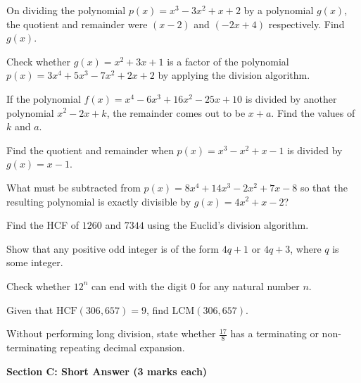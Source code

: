 \documentclass[12pt,a4paper]{exam}
\begin{document}
\begin{questions}
\question[2] On dividing the polynomial $p(x) = x^3 - 3x^2 + x + 2$ by a polynomial $g(x)$, the quotient and remainder were $(x - 2)$ and $(-2x + 4)$ respectively. Find $g(x)$.
\vspace{0.15cm}

\question[2] Check whether $g(x) = x^2 + 3x + 1$ is a factor of the polynomial $p(x) = 3x^4 + 5x^3 - 7x^2 + 2x + 2$ by applying the division algorithm.
\vspace{0.15cm}

\question[2] If the polynomial $f(x) = x^4 - 6x^3 + 16x^2 - 25x + 10$ is divided by another polynomial $x^2 - 2x + k$, the remainder comes out to be $x + a$. Find the values of $k$ and $a$.
\vspace{0.15cm}

\question[2] Find the quotient and remainder when $p(x) = x^3 - x^2 + x - 1$ is divided by $g(x) = x - 1$.
\vspace{0.15cm}

\question[2] What must be subtracted from $p(x) = 8x^4 + 14x^3 - 2x^2 + 7x - 8$ so that the resulting polynomial is exactly divisible by $g(x) = 4x^2 + x - 2$?
\vspace{0.15cm}

\question[2] Find the HCF of $1260$ and $7344$ using the Euclid's division algorithm.
\vspace{0.15cm}

\question[2] Show that any positive odd integer is of the form $4q + 1$ or $4q + 3$, where $q$ is some integer.
\vspace{0.15cm}

\question[2] Check whether $12^n$ can end with the digit $0$ for any natural number $n$.
\vspace{0.15cm}

\question[2] Given that $\text{HCF}(306, 657) = 9$, find $\text{LCM}(306, 657)$.
\vspace{0.15cm}

\question[2] Without performing long division, state whether $\frac{17}{8}$ has a terminating or non-terminating repeating decimal expansion.
\vspace{0.15cm}

\end{questions}
\bigskip
\noindent\textbf{\large Section C: Short Answer (3 marks each)}
\end{document}
